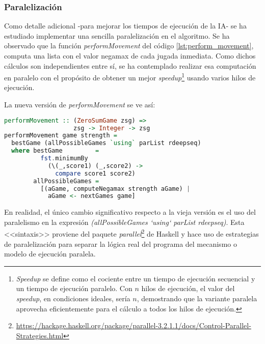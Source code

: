 \documentclass{llncs}
\begin{document}
\subsubsection{ Paralelización }

Como detalle adicional -para mejorar los tiempos de ejecución de la IA- se ha estudiado implementar una sencilla paralelización en el algoritmo. Se ha observado que la función \textit{performMovement} del código \ref{lst:perform_movement}, computa una lista con el valor negamax de cada jugada inmediata. Como dichos cálculos son independientes entre sí, se ha contemplado realizar esa computación en paralelo con el propósito de obtener un mejor \textit{speedup}\footnote{\textit{Speedup} se define como el cociente entre un tiempo de ejecución secuencial y un tiempo de ejecución paralelo. Con $n$ hilos de ejecución, el valor del \textit{speedup}, en condiciones ideales, sería $n$, demostrando que la variante paralela aprovecha eficientemente para el cálculo a todos los hilos de ejecución.} usando varios hilos de ejecución.

La nueva versión de \textit{performMovement} se ve así:

\begin{lstlisting}[frame=single, language=haskell, captionpos=b, caption=Definición paralela de performMovement]
performMovement :: (ZeroSumGame zsg) =>
                   zsg -> Integer -> zsg
performMovement game strength =
  bestGame (allPossibleGames `using` parList rdeepseq)
  where bestGame         =
          fst.minimumBy
            (\(_,score1) (_,score2) ->
              compare score1 score2)
        allPossibleGames =
          [(aGame, computeNegamax strength aGame) |
            aGame <- nextGames game]
\end{lstlisting}

En realidad, el único cambio significativo respecto a la vieja versión es el uso del paralelismo en la expresión \textit{(allPossibleGames `using` parList rdeepseq)}. Esta <<sintaxis>> proviene del paquete \textit{parallel}\footnote{\url{https://hackage.haskell.org/package/parallel-3.2.1.1/docs/Control-Parallel-Strategies.html}} de Haskell y hace uso de estrategias de paralelización para separar la lógica real del programa del mecanismo o modelo de ejecución paralela.
\end{document}
